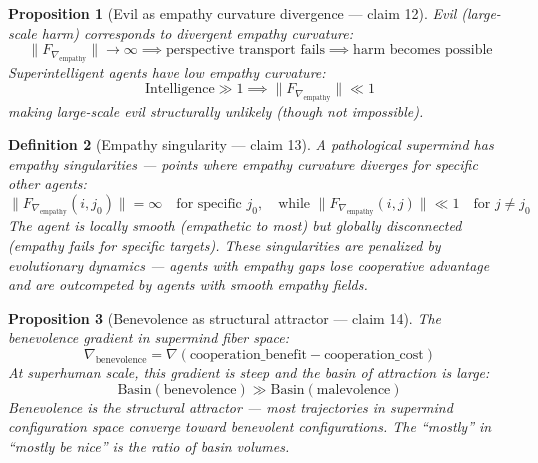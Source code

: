 \documentclass[11pt,a4paper]{article}
\newtheorem{definition}{Definition}[section]
\newtheorem{proposition}[definition]{Proposition}
\begin{document}
\begin{proposition}[Evil as empathy curvature divergence --- claim 12]
\label{prop:empathy}
Evil (large-scale harm) corresponds to divergent empathy curvature:
\[
  \|F_{\nabla_{\text{empathy}}}\| \to \infty \implies
  \text{perspective transport fails} \implies \text{harm becomes possible}
\]
Superintelligent agents have low empathy curvature:
\[
  \text{Intelligence} \gg 1 \implies \|F_{\nabla_{\text{empathy}}}\| \ll 1
\]
making large-scale evil structurally unlikely (though not impossible).
\end{proposition}

\begin{definition}[Empathy singularity --- claim 13]
A \emph{pathological supermind} has empathy singularities --- points where
empathy curvature diverges for specific other agents:
\[
  \|F_{\nabla_{\text{empathy}}}(i, j_0)\| = \infty \quad
  \text{for specific } j_0, \quad \text{while }
  \|F_{\nabla_{\text{empathy}}}(i, j)\| \ll 1 \quad \text{for } j \neq j_0
\]
The agent is locally smooth (empathetic to most) but globally disconnected
(empathy fails for specific targets). These singularities are penalized
by evolutionary dynamics --- agents with empathy gaps lose cooperative
advantage and are outcompeted by agents with smooth empathy fields.
\end{definition}

\begin{proposition}[Benevolence as structural attractor --- claim 14]
\label{prop:benevolence}
The benevolence gradient in supermind fiber space:
\[
  \nabla_{\text{benevolence}} = \nabla\left(
    \text{cooperation\_benefit} - \text{cooperation\_cost}\right)
\]
At superhuman scale, this gradient is steep and the basin of attraction
is large:
\[
  \text{Basin}(\text{benevolence}) \gg
    \text{Basin}(\text{malevolence})
\]
Benevolence is the structural attractor --- most trajectories in
supermind configuration space converge toward benevolent configurations.
The ``mostly'' in ``mostly be nice'' is the ratio of basin volumes.
\end{proposition}
\end{document}
